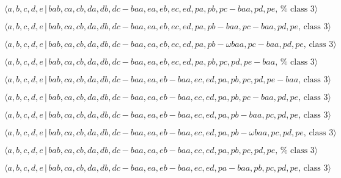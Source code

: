 \documentclass[10pt]{article}
\begin{document}
\begin{equation}
\langle
a,b,c,d,e\,|\,bab,ca,cb,da,db,dc-baa,ea,eb,ec,ed,pa,pb,pc-baa,pd,pe,\,\text{%
class }3\rangle  \tag{7.4754}
\end{equation}

\begin{equation}
\langle
a,b,c,d,e\,|\,bab,ca,cb,da,db,dc-baa,ea,eb,ec,ed,pa,pb-baa,pc-baa,pd,pe,\,%
\text{class }3\rangle  \tag{7.4755}
\end{equation}

\begin{equation}
\langle a,b,c,d,e\,|\,bab,ca,cb,da,db,dc-baa,ea,eb,ec,ed,pa,pb-\omega
baa,pc-baa,pd,pe,\,\text{class }3\rangle  \tag{7.4756}
\end{equation}

\begin{equation}
\langle
a,b,c,d,e\,|\,bab,ca,cb,da,db,dc-baa,ea,eb,ec,ed,pa,pb,pc,pd,pe-baa,\,\text{%
class }3\rangle  \tag{7.4757}
\end{equation}

\begin{equation}
\langle
a,b,c,d,e\,|\,bab,ca,cb,da,db,dc-baa,ea,eb-baa,ec,ed,pa,pb,pc,pd,pe-baa,\,%
\text{class }3\rangle  \tag{7.4758}
\end{equation}

\begin{equation}
\langle
a,b,c,d,e\,|\,bab,ca,cb,da,db,dc-baa,ea,eb-baa,ec,ed,pa,pb,pc-baa,pd,pe,\,%
\text{class }3\rangle  \tag{7.4759}
\end{equation}

\begin{equation}
\langle
a,b,c,d,e\,|\,bab,ca,cb,da,db,dc-baa,ea,eb-baa,ec,ed,pa,pb-baa,pc,pd,pe,\,%
\text{class }3\rangle  \tag{7.4760}
\end{equation}

\begin{equation}
\langle a,b,c,d,e\,|\,bab,ca,cb,da,db,dc-baa,ea,eb-baa,ec,ed,pa,pb-\omega
baa,pc,pd,pe,\,\text{class }3\rangle  \tag{7.4761}
\end{equation}

\begin{equation}
\langle
a,b,c,d,e\,|\,bab,ca,cb,da,db,dc-baa,ea,eb-baa,ec,ed,pa,pb,pc,pd,pe,\,\text{%
class }3\rangle  \tag{7.4762}
\end{equation}

\begin{equation}
\langle
a,b,c,d,e\,|\,bab,ca,cb,da,db,dc-baa,ea,eb-baa,ec,ed,pa-baa,pb,pc,pd,pe,\,%
\text{class }3\rangle  \tag{7.4763}
\end{equation}
\end{document}
